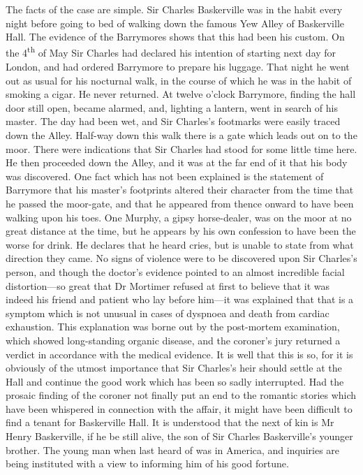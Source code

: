 \documentclass[paper=a5,BCOR=7mm,twoside,DIV=calc,12pt,usegeometry,openany,chapterprefix,endperiod,headings=big]{scrbook} %
\begin{document}
\textsf{The facts of the case are simple. Sir Charles Baskerville was in the habit every night before going to bed of walking down the famous Yew Alley of Baskerville Hall. The evidence of the Barrymores shows that this had been his custom. On the 4\textsuperscript{th} of May Sir Charles had declared his intention of starting next day for London, and had ordered Barrymore to prepare his luggage. That night he went out as usual for his nocturnal walk, in the course of which he was in the habit of smoking a cigar. He never returned. At twelve o'clock Barrymore, finding the hall door still open, became alarmed, and, lighting a lantern, went in search of his master. The day had been wet, and Sir Charles's footmarks were easily traced down the Alley. Half-way down this walk there is a gate which leads out on to the moor. There were indications that Sir Charles had stood for some little time here. He then proceeded down the Alley, and it was at the far end of it that his body was discovered. One fact which has not been explained is the statement of Barrymore that his master's footprints altered their character from the time that he passed the moor-gate, and that he appeared from thence onward to have been walking upon his toes. One Murphy, a gipsy horse-dealer, was on the moor at no great distance at the time, but he appears by his own confession to have been the worse for drink. He declares that he heard cries, but is unable to state from what direction they came. No signs of violence were to be discovered upon Sir Charles's person, and though the doctor's evidence pointed to an almost incredible facial distortion---so great that Dr Mortimer refused at first to believe that it was indeed his friend and patient who lay before him---it was explained that that is a symptom which is not unusual in cases of dyspnoea and death from cardiac exhaustion. This explanation was borne out by the post-mortem examination, which showed long-standing organic disease, and the coroner's jury returned a verdict in accordance with the medical evidence. It is well that this is so, for it is obviously of the utmost importance that Sir Charles's heir should settle at the Hall and continue the good work which has been so sadly interrupted. Had the prosaic finding of the coroner not finally put an end to the romantic stories which have been whispered in connection with the affair, it might have been difficult to find a tenant for Baskerville Hall. It is understood that the next of kin is Mr Henry Baskerville, if he be still alive, the son of Sir Charles Baskerville's younger brother. The young man when last heard of was in America, and inquiries are being instituted with a view to informing him of his good fortune.} \\
\end{document}
